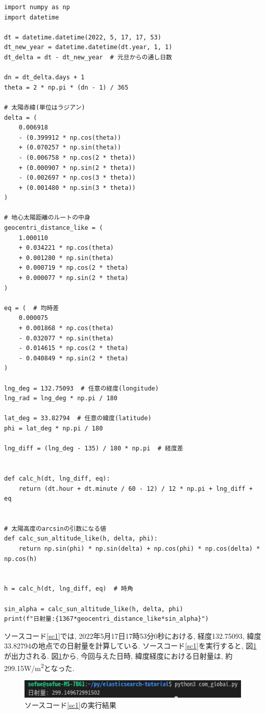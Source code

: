 \documentclass[a4j,12pt,]{jarticle}
\begin{document}
\begin{lstlisting}[caption=任意の緯度経度と日時から日射量を計算するプログラム, label=sc1]
import numpy as np
import datetime

dt = datetime.datetime(2022, 5, 17, 17, 53)
dt_new_year = datetime.datetime(dt.year, 1, 1)
dt_delta = dt - dt_new_year  # 元旦からの通し日数

dn = dt_delta.days + 1
theta = 2 * np.pi * (dn - 1) / 365

# 太陽赤緯(単位はラジアン)
delta = (
    0.006918
    - (0.399912 * np.cos(theta))
    + (0.070257 * np.sin(theta))
    - (0.006758 * np.cos(2 * theta))
    + (0.000907 * np.sin(2 * theta))
    - (0.002697 * np.cos(3 * theta))
    + (0.001480 * np.sin(3 * theta))
)

# 地心太陽距離のルートの中身
geocentri_distance_like = (
    1.000110
    + 0.034221 * np.cos(theta)
    + 0.001280 * np.sin(theta)
    + 0.000719 * np.cos(2 * theta)
    + 0.000077 * np.sin(2 * theta)
)

eq = (  # 均時差
    0.000075
    + 0.001868 * np.cos(theta)
    - 0.032077 * np.sin(theta)
    - 0.014615 * np.cos(2 * theta)
    - 0.040849 * np.sin(2 * theta)
)

lng_deg = 132.75093  # 任意の経度(longitude)
lng_rad = lng_deg * np.pi / 180

lat_deg = 33.82794  # 任意の緯度(latitude)
phi = lat_deg * np.pi / 180

lng_diff = (lng_deg - 135) / 180 * np.pi  # 経度差


def calc_h(dt, lng_diff, eq):
    return (dt.hour + dt.minute / 60 - 12) / 12 * np.pi + lng_diff + eq


# 太陽高度のarcsinの引数になる値
def calc_sun_altitude_like(h, delta, phi):
    return np.sin(phi) * np.sin(delta) + np.cos(phi) * np.cos(delta) * np.cos(h)


h = calc_h(dt, lng_diff, eq)  # 時角

sin_alpha = calc_sun_altitude_like(h, delta, phi)
print(f"日射量:{1367*geocentri_distance_like*sin_alpha}")
\end{lstlisting}

ソースコード\ref{sc1}では, 2022年5月17日17時53分0秒における, 経度132.75093, 緯度33.82794の地点での日射量を計算している.
ソースコード\ref{sc1}を実行すると, 図\ref{p1}が出力される.
図\ref{p1}から, 今回与えた日時, 緯度経度における日射量は, 約299.15\si{\watt}/\si{\metre\squared}となった.

\begin{figure}[H]
  \begin{center}
    \includegraphics[width=160mm]{output.png}
    \caption{ソースコード\ref{sc1}の実行結果}
    \label{p1}
  \end{center}
\end{figure}
\end{document}
